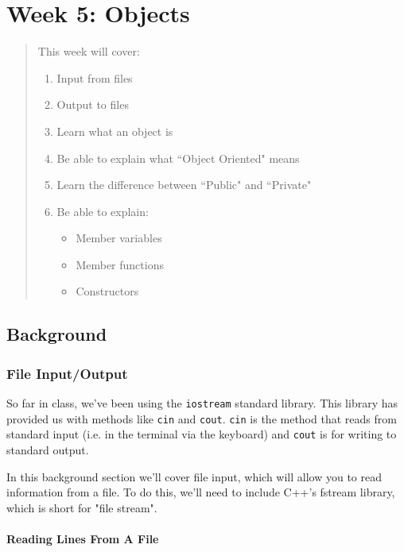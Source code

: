 \chapter*{Week 5: Objects}
\setcounter{chapter}{6}
\setcounter{section}{0}

\begin{abstract}
This week will cover:
\begin{enumerate}
    \item Input from files
    \item Output to files
    \item Learn what an object is
    \item Be able to explain what ``Object Oriented" means
    \item Learn the difference between ``Public" and ``Private"
    \item Be able to explain:
    \begin{itemize}
        \item Member variables
        \item Member functions
        \item Constructors
    \end{itemize}
\end{enumerate}
    
\end{abstract}

\section{Background}
\subsection{File Input/Output}
So far in class, we've been using the \texttt{iostream} standard library. This library has provided us with methods like \texttt{cin} and \texttt{cout}. \texttt{cin} is the method that reads from standard input (i.e. in the terminal via the keyboard) and \texttt{cout} is for writing to standard output.

In this background section we'll cover file input, which will allow you to read information from a file. To do this, we'll need to include C++'s fstream library, which is short for "file stream".

\subsubsection{Reading Lines From A File}


